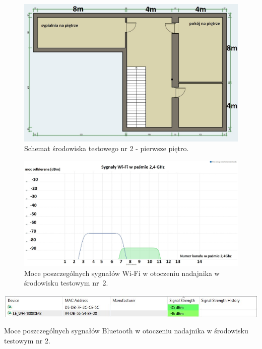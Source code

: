 \documentclass[12pt, twoside, openany]{mwrep}
\begin{document}
\begin{figure}[H]
\centering
\includegraphics[width=\textwidth]{dom2pietro}
\caption{Schemat środowiska testowego nr 2 - pierwsze piętro.}
\end{figure}
\begin{figure}[H]
\centering
\includegraphics[width=\textwidth]{2,4Ghz_Dom}
\caption{Moce poszczególnych sygnałów Wi-Fi w otoczeniu nadajnika w środowisku testowym nr~2.}
\end{figure}
\begin{table}[H]
\centering
\includegraphics[width=\textwidth]{bt_dom}
\caption{Moce poszczególnych sygnałów Bluetooth w otoczeniu nadajnika w środowisku testowym nr 2.}
\end{table}

\end{document}
